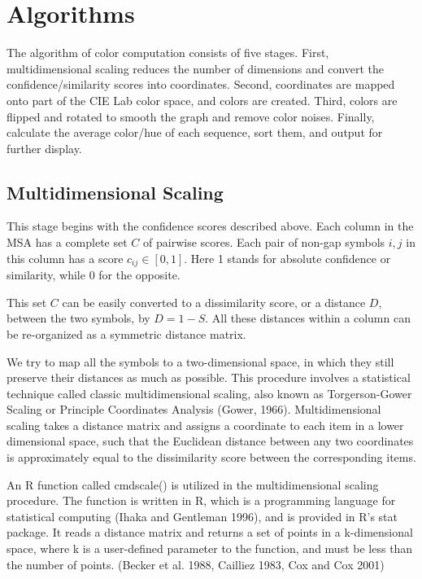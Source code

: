 \chapter{Algorithms}\label{chap:Algorithms}

The algorithm of color computation consists of five stages. First, multidimensional scaling reduces the number of dimensions and convert the confidence/similarity scores into coordinates. Second, coordinates are mapped onto part of the CIE Lab color space\cite {McLAREN:1976aa}, and colors are created. Third, colors are flipped and rotated to smooth the graph and remove color noises. Finally, calculate the average color/hue of each sequence, sort them, and output for further display.

\section{Multidimensional Scaling}

This stage begins with the confidence scores described above. Each column in the MSA has a complete set $C$ of pairwise scores. Each pair of non-gap symbols $i,j$ in this column has a score $c_{ij} \in [0,1]$. Here 1 stands for absolute confidence or similarity, while 0 for the opposite.

This set $C$ can be easily converted to a dissimilarity score, or a distance $D$, between the two symbols, by $D=1-S$. All these distances within a column can be re-organized as a symmetric distance matrix.

We try to map all the symbols to a two-dimensional space, in which they still preserve their distances as much as possible. This procedure involves a statistical technique called classic multidimensional scaling, also known as Torgerson-Gower Scaling or Principle Coordinates Analysis (Gower, 1966). Multidimensional scaling takes a distance matrix and assigns a coordinate to each item in a lower dimensional space, such that the Euclidean distance between any two coordinates is approximately equal to the dissimilarity score between the corresponding items.

An R function called cmdscale() is utilized in the multidimensional scaling procedure. The function is written in R, which is a programming language for statistical computing (Ihaka and Gentleman 1996), and is provided in R’s stat package. It reads a distance matrix and returns a set of points in a k-dimensional space, where k is a user-defined parameter to the function, and must be less than the number of points. (Becker et al. 1988, Cailliez 1983, Cox and Cox 2001)

